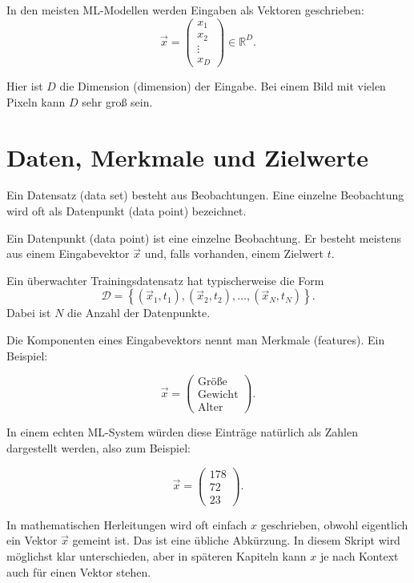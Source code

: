 In den meisten ML-Modellen werden Eingaben als Vektoren geschrieben:
\[
    \vec{x}
    =
    \begin{pmatrix}
        x_1 \\
        x_2 \\
        \vdots \\
        x_D
    \end{pmatrix}
    \in \mathbb{R}^D.
\]

Hier ist \(D\) die Dimension (dimension) der Eingabe.
Bei einem Bild mit vielen Pixeln kann \(D\) sehr groß sein.

\section{Daten, Merkmale und Zielwerte}

Ein Datensatz (data set) besteht aus Beobachtungen.
Eine einzelne Beobachtung wird oft als Datenpunkt (data point) bezeichnet.

\begin{definitionbox}
Ein Datenpunkt (data point) ist eine einzelne Beobachtung.
Er besteht meistens aus einem Eingabevektor \(\vec{x}\) und, falls vorhanden, einem Zielwert \(t\).

Ein überwachter Trainingsdatensatz hat typischerweise die Form
\[
    \mathcal{D}
    =
    \left\{
        (\vec{x}_1,t_1),
        (\vec{x}_2,t_2),
        \dots,
        (\vec{x}_N,t_N)
    \right\}.
\]
Dabei ist \(N\) die Anzahl der Datenpunkte.
\end{definitionbox}

Die Komponenten eines Eingabevektors nennt man Merkmale (features).
Ein Beispiel:

\[
    \vec{x}
    =
    \begin{pmatrix}
        \text{Größe} \\
        \text{Gewicht} \\
        \text{Alter}
    \end{pmatrix}.
\]

In einem echten ML-System würden diese Einträge natürlich als Zahlen dargestellt werden, also zum Beispiel:

\[
    \vec{x}
    =
    \begin{pmatrix}
        178 \\
        72 \\
        23
    \end{pmatrix}.
\]

\begin{notebox}
In mathematischen Herleitungen wird oft einfach \(x\) geschrieben, obwohl eigentlich ein Vektor \(\vec{x}\) gemeint ist.
Das ist eine übliche Abkürzung.
In diesem Skript wird möglichst klar unterschieden, aber in späteren Kapiteln kann \(x\) je nach Kontext auch für einen Vektor stehen.
\end{notebox}

